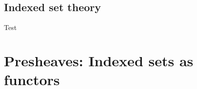 \documentclass[../main.tex]{subfiles}
\begin{document}
\subsection*{Indexed set theory}

Test

\section{Presheaves: Indexed sets as functors}

\ifSubfilesClassLoaded{%
    }%
\end{document}
